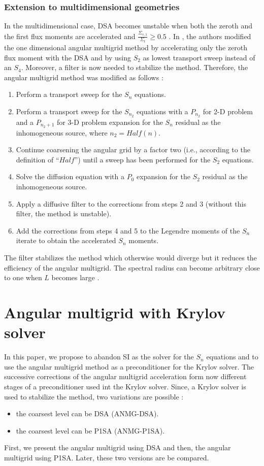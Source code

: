 \subsubsection{Extension to multidimensional geometries}
In the multidimensional case, DSA becomes unstable when both the zeroth
and the first flux moments are accelerated and $\frac{\Sigma_{s,1}}{\Sigma_t}
\geq 0.5$ \cite{multisweep}. In \cite{multigrid_2d}, the authors modified the
one dimensional angular multigrid method by accelerating only the zeroth flux
moment with the DSA and by using $S_2$ as lowest transport sweep
instead of an $S_4$. Moreover, a
filter is now needed to stabilize the method. Therefore, the angular multigrid 
method was modified as follows \cite{multigrid_2d} :
\begin{enumerate}
\item Perform a transport sweep for the $S_n$ equations.
\item Perform a transport sweep for the $S_{n_2}$ equations with a $P_{n_2}$
for 2-D problem and a $P_{n_2+1}$ for 3-D problem expansion for the $S_n$
residual as the inhomogeneous source, where $n_2=Half(n)$.
\item Continue coarsening the angular grid by a factor two (i.e., according to the
definition of ``$Half$'') until a sweep has been performed for the $S_2$
equations.
\item Solve the diffusion equation with a $P_0$ expansion for the $S_2$
residual as the inhomogeneous source. 
\item Apply a diffusive filter to the corrections from steps 2 and 3 (without
this filter, the method is unstable).
\item Add the corrections from steps 4 and 5 to the Legendre moments of the
$S_n$ iterate to obtain the accelerated $S_n$ moments.
\end{enumerate}
The filter stabilizes the method which otherwise would diverge but it reduces
the efficiency of the angular multigrid. The spectral radius can become
arbitrary close to one when $L$ becomes large \cite{multigrid_2d}.
\section{Angular multigrid with Krylov solver}
In this paper, we propose to abandon SI as the solver for the $S_n$ equations 
and to use the angular multigrid method as a preconditioner for the Krylov solver. 
The successive corrections of the angular multigrid acceleration form
now different stages of a preconditioner used int the Krylov solver. Since, a Krylov solver is used to
stabilize the method, two variations are possible :
\begin{itemize}
\item the coarsest level can be DSA (ANMG-DSA).
\item the coarsest level can be P1SA (ANMG-P1SA).
\end{itemize}
First, we present the angular multigrid using DSA and then, the angular
multigrid using P1SA. Later, these two versions are be compared.
